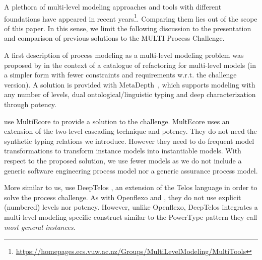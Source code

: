 
A plethora of multi-level modeling approaches and tools with different foundations have appeared in recent years\footnote{\url{https://homepages.ecs.vuw.ac.nz/Groups/MultiLevelModeling/MultiTools}}. Comparing them lies out of the scope of this paper. In this sense, we limit the following discussion to the presentation and comparison of previous solutions to the MULTI Process Challenge.

A first description of process modeling as a multi-level modeling problem was proposed by \cite{lara2018refactoring} in the context of a catalogue of refactoring for multi-level models (in a simpler form with fewer constraints and requirements w.r.t. the challenge version). A solution is provided with MetaDepth~\citep{metadepth}, which supports modeling with any number of levels, dual ontological/linguistic typing and deep characterization through potency.

\cite{multiecore2019} use MultiEcore \citep{multecore2016} to provide a solution to the challenge. MultEcore uses an extension of the two-level cascading technique and potency. They do not need the synthetic typing relations we introduce. However they need to do frequent model transformations to transform instance models into instantiable models. With respect to the proposed solution, we use fewer models as we do not include a generic software engineering process model nor a generic assurance process model. %

More similar to us, \cite{deeptelos2019} use DeepTelos \citep{deeptelos2016}, an extension of the Telos language \citep{telos1990} in order to solve the process challenge. As with Openflexo and \FML, they do not use explicit (numbered) levels nor potency. However, unlike Openflexo, DeepTelos integrates a multi-level modeling specific construct similar to the PowerType \citep{atkinson2001essence} pattern they call \emph{most general instances}.


